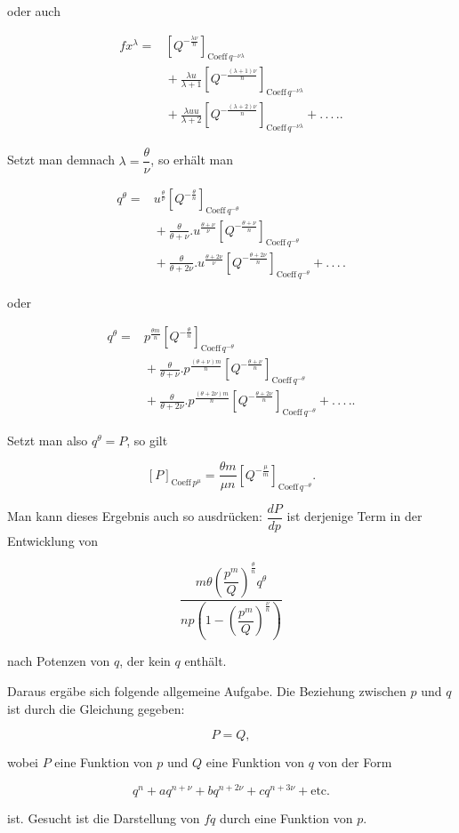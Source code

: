 \noindent oder auch

\[
\begin{aligned}fx^\lambda ={}& \left[Q^{-\frac{\lambda\nu}{n}}\right]_{\text{Coeff}\,q^{-\nu\lambda}}\\ &{}+ \frac{\lambda u}{\lambda+1}\left[Q^{-\frac{(\lambda+1)\nu}{n}}\right]_{\text{Coeff}\,q^{-\nu\lambda}}\\ &{}+ \frac{\lambda uu}{\lambda+2}\left[Q^{-\frac{(\lambda+2)\nu}{n}}\right]_{\text{Coeff}\,q^{-\nu\lambda}}+.\,.\,.\,..
\end{aligned}
\]

\noindent Setzt man demnach $\lambda = \dfrac{\theta}{\nu}$, so erhält man

\[
\begin{aligned}q^\theta ={}& u^{\frac{\theta}{\nu}}\left[Q^{-\frac{\theta}{n}}\right]_{\text{Coeff}\,q^{-\theta}}\\ &{}+ \frac{\theta}{\theta+\nu} .  u^{\frac{\theta+\nu}{\nu}}\left[Q^{-\frac{\theta+\nu}{n}}\right]_{\text{Coeff}\,q^{-\theta}}\\ &{}+ \frac{\theta}{\theta+2\nu} .  u^{\frac{\theta+2\nu}{\nu}}\left[Q^{-\frac{\theta+2\nu}{n}}\right]_{\text{Coeff}\,q^{-\theta}}+.\,.\,.\,.
\end{aligned}
\]

\noindent oder

\[
\begin{aligned}q^\theta ={}& p^{\frac{\theta m}{n}}\left[Q^{-\frac{\theta}{n}}\right]_{\text{Coeff}\,q^{-\theta}}\\ &{}+ \frac{\theta}{\theta+\nu} .  p^{\frac{(\theta+\nu)m}{n}}\left[Q^{-\frac{\theta+\nu}{n}}\right]_{\text{Coeff}\,q^{-\theta}}\\ &{}+ \frac{\theta}{\theta+2\nu} .  p^{\frac{(\theta+2\nu)m}{n}}\left[Q^{-\frac{\theta+2\nu}{n}}\right]_{\text{Coeff}\,q^{-\theta}}+.\,.\,.\,..
\end{aligned}
\]

Setzt man also $q^\theta = P$, so gilt

\[
[P]_{\text{Coeff}\,p^\mu} = \frac{\theta m}{\mu n}\left[Q^{-\frac{\mu}{m}}\right]_{\text{Coeff}\,q^{-\theta}}.
\]

\noindent Man kann dieses Ergebnis auch so ausdrücken: $\dfrac{dP}{dp}$ ist derjenige Term in der Entwicklung von

\[
\frac{m\theta\left(\dfrac{p^m}{Q}\right)^{\frac{\theta}{n}}q^\theta}{np\left(1-\left(\dfrac{p^m}{Q}\right)^{\frac{\nu}{n}}\right)}
\]

\noindent nach Potenzen von $q$, der kein $q$ enthält.

Daraus ergäbe sich folgende allgemeine Aufgabe. Die Beziehung zwischen $p$ und $q$ ist durch die Gleichung gegeben:

\[
P = Q,
\]

\noindent wobei $P$ eine Funktion von $p$ und $Q$ eine Funktion von $q$ von der Form

\[
q^n+aq^{n+\nu}+bq^{n+2\nu}+cq^{n+3\nu}+\text{etc.}
\]

\noindent ist. Gesucht ist die Darstellung von $fq$ durch eine Funktion von $p$.

